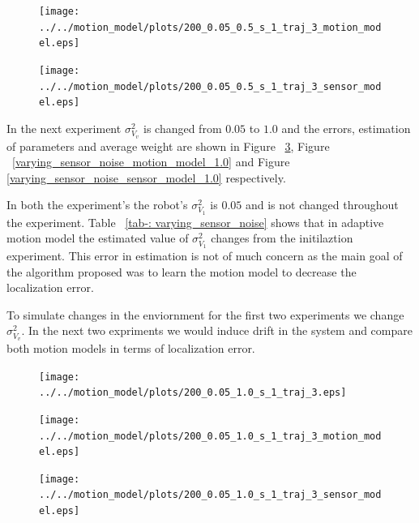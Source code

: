 \documentclass[12pt,draft]{dalcsthesis}
\begin{document}
   
\begin{figure}
  \centering
     {\texttt{[image: ../../motion\_model/plots/200\_0.05\_0.5\_s\_1\_traj\_3\_motion\_model.eps]}}
  \caption{\label{fig-varying_sensor_noise_motion_model} }
\end{figure}

\begin{figure}
  \centering
     {\texttt{[image: ../../motion\_model/plots/200\_0.05\_0.5\_s\_1\_traj\_3\_sensor\_model.eps]}}
  \caption{\label{fig-varying_sensor_noise_sensor_model} }
\end{figure}

In the next experiment $\sigma_{V_{v}}^2$ is changed from $0.05$ to $1.0$ and the errors, estimation of parameters and average weight are shown in Figure ~\ref{fig-varying_sensor_noise_1.0}, Figure ~\ref{varying_sensor_noise_motion_model_1.0} and Figure \ref{varying_sensor_noise_sensor_model_1.0} respectively. 

In both the experiment's the robot's $\sigma_{V_{1}}^2$ is $0.05$ and is not changed throughout the experiment. Table ~\ref{tab-: varying_sensor_noise} shows that in adaptive motion model the estimated value of $\sigma_{V_{1}}^2$ changes from the initilaztion experiment. This error in estimation is not of much concern as the main goal of the algorithm proposed was to learn the motion model to decrease the localization error. 

To simulate changes in the enviornment for the first two experiments we change $\sigma_{V_{v}}^2$. In the next two expriments we would induce drift in the system and compare both motion models in terms of localization error.
 

\begin{figure}
  \centering
     {\texttt{[image: ../../motion\_model/plots/200\_0.05\_1.0\_s\_1\_traj\_3.eps]}}
  \caption{\label{fig-varying_sensor_noise_1.0} }
\end{figure}
   
   
\begin{figure}
  \centering
     {\texttt{[image: ../../motion\_model/plots/200\_0.05\_1.0\_s\_1\_traj\_3\_motion\_model.eps]}}
  \caption{\label{fig-varying_sensor_noise_motion_model_1.0} }
\end{figure}

\begin{figure}
  \centering
     {\texttt{[image: ../../motion\_model/plots/200\_0.05\_1.0\_s\_1\_traj\_3\_sensor\_model.eps]}}
  \caption{\label{fig-varying_sensor_noise_sensor_model_1.0} }
\end{figure}
\end{document}
